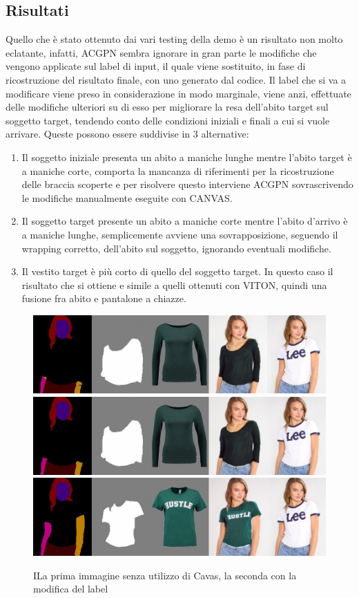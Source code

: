\documentclass[final, 11pt]{article}
\begin{document}
	\subsection{Risultati}
	Quello che è stato ottenuto dai vari testing della demo è un risultato non molto eclatante, infatti, ACGPN sembra ignorare in gran parte le modifiche che vengono applicate sul label di input, il quale viene sostituito, in fase di ricostruzione del risultato finale, con uno generato dal codice.
	Il label che si va a modificare viene preso in considerazione in modo marginale, viene anzi, effettuate delle modifiche ulteriori su di esso per migliorare la resa dell’abito target sul soggetto target, tendendo conto delle condizioni iniziali e finali a cui si vuole arrivare. 
	Queste possono essere suddivise in 3 alternative:
	\begin{enumerate}
		\item Il soggetto iniziale presenta un abito a maniche lunghe mentre l’abito target è a maniche corte, comporta la mancanza di riferimenti per la ricostruzione delle braccia scoperte e per risolvere questo interviene ACGPN sovrascrivendo le modifiche manualmente eseguite con CANVAS.
		\item Il soggetto target presente un abito a maniche corte mentre l’abito d’arrivo è a maniche lunghe, semplicemente avviene una sovrapposizione, seguendo il wrapping corretto, dell’abito sul soggetto, ignorando eventuali modifiche.
		\item Il vestito target è più corto di quello del soggetto target. In questo caso il risultato che si ottiene e simile a quelli ottenuti con VITON, quindi una fusione fra abito e pantalone a chiazze.
	\end{enumerate}
	
	
	\begin{figure}[!htb]
		\centering
		\includegraphics[width=0.7\linewidth]{demo2.jpg}
		\includegraphics[width=0.7\linewidth]{demo2_b.jpg}
		\includegraphics[width=0.7\linewidth]{OtherRes.jpg}
		\caption{ILa prima immagine senza utilizzo di Cavas, la seconda con la modifica del label}
	\end{figure} 


	
\end{document}
